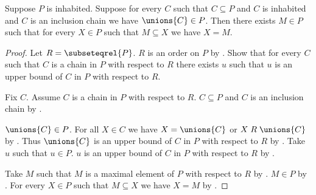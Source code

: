 \begin{theorem}\label{zorn_subset_family}
    Suppose $P$ is inhabited.
    Suppose for every $C$ such that $C\subseteq P$ and $C$ is inhabited
        and $C$ is an inclusion chain we have $\unions{C}\in P$.
    Then there exists $M\in P$ such that for every $X\in P$ such that
        $M\subseteq X$ we have $X=M$.
\end{theorem}
\begin{proof}
    Let $R=\subseteqrel{P}$.
    $R$ is an order on $P$ by .
    Show that for every $C$ such that $C$ is a chain in $P$ with respect to $R$
        there exists $u$ such that $u$ is an upper bound of $C$ in $P$
            with respect to $R$.
    \begin{subproof}
        Fix $C$.
        Assume $C$ is a chain in $P$ with respect to $R$.
        $C\subseteq P$ and $C$ is an inclusion chain
            by .
        \begin{byCase}
            $\unions{C}\in P$.
            For all $X\in C$ we have
                $X=\unions{C}$ or $X\mathrel{R}\unions{C}$
                by .
            Thus $\unions{C}$ is an upper bound of $C$ in $P$
                with respect to $R$ by .
            Take $u$ such that $u\in P$.
            $u$ is an upper bound of $C$ in $P$ with respect to $R$
                by .
        \end{byCase}
    \end{subproof}
    Take $M$ such that $M$ is a maximal element of $P$ with respect to $R$
        by .
    $M\in P$ by .
    For every $X\in P$ such that $M\subseteq X$ we have $X=M$
        by .
\end{proof}
